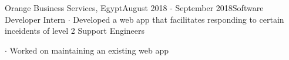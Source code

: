 \vspace{3mm}

\begin{verbose}{Orange Business Services, Egypt}{August 2018 - September 2018}{Software Developer Intern}
    \noindent $\cdot$ Developed a web app that facilitates responding to certain inceidents of level 2 Support Engineers

    \noindent $\cdot$ Worked on maintaining an existing web app
\end{verbose}

